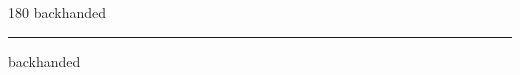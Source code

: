 
\begin{frame}
\begin{center}
\begin{turn}{180}
{\fontsize{2.5cm}{1em}\selectfont backhanded}
\end{turn}
\vspace{1em}\par  
\hrule
\vspace{1em}\par  
{\fontsize{2.5cm}{1em}\selectfont backhanded}
\end{center}
\end{frame}
